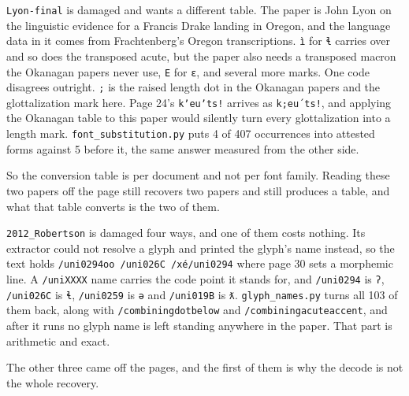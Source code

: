 \texttt{Lyon-\allowbreak{}final} is damaged and wants a different table. The paper is John Lyon on the linguistic evidence for a Francis Drake landing in Oregon, and the language data in it comes from Frachtenberg's Oregon transcriptions. \texttt{ì} for \texttt{ɬ} carries over and so does the transposed acute, but the paper also needs a transposed macron the Okanagan papers never use, \texttt{E} for \texttt{ɛ}, and several more marks. One code disagrees outright. \texttt{;} is the raised length dot in the Okanagan papers and the glottalization mark here. Page 24's \texttt{kʼeuʼts!} arrives as \texttt{k;eu´ts!}, and applying the Okanagan table to this paper would silently turn every glottalization into a length mark. \texttt{font\_\allowbreak{}substitution.\allowbreak{}py} puts 4 of 407 occurrences into attested forms against 5 before it, the same answer measured from the other side.

So the conversion table is per document and not per font family. Reading these two papers off the page still recovers two papers and still produces a table, and what that table converts is the two of them.

\texttt{2012\_\allowbreak{}Robertson} is damaged four ways, and one of them costs nothing. Its extractor could not resolve a glyph and printed the glyph's name instead, so the text holds \texttt{/\allowbreak{}uni0294oo /\allowbreak{}uni026C /\allowbreak{}xé/\allowbreak{}uni0294} where page 30 sets a morphemic line. A \texttt{/\allowbreak{}uni\allowbreak{}XXXX} name carries the code point it stands for, and \texttt{/\allowbreak{}uni0294} is \texttt{ʔ}, \texttt{/\allowbreak{}uni026C} is \texttt{ɬ}, \texttt{/\allowbreak{}uni0259} is \texttt{ə} and \texttt{/\allowbreak{}uni019B} is \texttt{ƛ}. \texttt{glyph\_\allowbreak{}names.\allowbreak{}py} turns all 103 of them back, along with \texttt{/\allowbreak{}combiningdotbelow} and \texttt{/\allowbreak{}combiningacuteaccent}, and after it runs no glyph name is left standing anywhere in the paper. That part is arithmetic and exact.

The other three came off the pages, and the first of them is why the decode is not the whole recovery.

